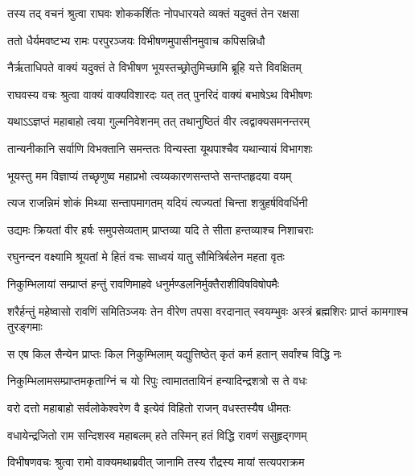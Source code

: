 
\twolineshloka
{तस्य तद् वचनं श्रुत्वा राघवः शोककर्शितः}
{नोपधारयते व्यक्तं यदुक्तं तेन रक्षसा} %

\twolineshloka
{ततो धैर्यमवष्टभ्य रामः परपुरञ्जयः}
{विभीषणमुपासीनमुवाच कपिसन्निधौ} %

\twolineshloka
{नैर्ऋताधिपते वाक्यं यदुक्तं ते विभीषण}
{भूयस्तच्छ्रोतुमिच्छामि ब्रूहि यत्ते विवक्षितम्} %

\twolineshloka
{राघवस्य वचः श्रुत्वा वाक्यं वाक्यविशारदः}
{यत् तत् पुनरिदं वाक्यं बभाषेऽथ विभीषणः} %

\twolineshloka
{यथाऽऽज्ञप्तं महाबाहो त्वया गुल्मनिवेशनम्}
{तत् तथानुष्ठितं वीर त्वद्वाक्यसमनन्तरम्} %

\twolineshloka
{तान्यनीकानि सर्वाणि विभक्तानि समन्ततः}
{विन्यस्ता यूथपाश्चैव यथान्यायं विभागशः} %

\twolineshloka
{भूयस्तु मम विज्ञाप्यं तच्छृणुष्व महाप्रभो}
{त्वय्यकारणसन्तप्ते सन्तप्तहृदया वयम्} %

\twolineshloka
{त्यज राजन्निमं शोकं मिथ्या सन्तापमागतम्}
{यदियं त्यज्यतां चिन्ता शत्रुहर्षविवर्धिनी} %

\twolineshloka
{उद्यमः क्रियतां वीर हर्षः समुपसेव्यताम्}
{प्राप्तव्या यदि ते सीता हन्तव्याश्च निशाचराः} %

\twolineshloka
{रघुनन्दन वक्ष्यामि श्रूयतां मे हितं वचः}
{साध्वयं यातु सौमित्रिर्बलेन महता वृतः} %

\twolineshloka
{निकुम्भिलायां सम्प्राप्तं हन्तुं रावणिमाहवे}
{धनुर्मण्डलनिर्मुक्तैराशीविषविषोपमैः} %

\threelineshloka
{शरैर्हन्तुं महेष्वासो रावणिं समितिञ्जयः}
{तेन वीरेण तपसा वरदानात् स्वयम्भुवः}
{अस्त्रं ब्रह्मशिरः प्राप्तं कामगाश्च तुरङ्गमाः} %

\twolineshloka
{स एष किल सैन्येन प्राप्तः किल निकुम्भिलाम्}
{यद्युत्तिष्ठेत् कृतं कर्म हतान् सर्वांश्च विद्धि नः} %

\twolineshloka
{निकुम्भिलामसम्प्राप्तमकृताग्निं च यो रिपुः}
{त्वामाततायिनं हन्यादिन्द्रशत्रो स ते वधः} %

\twolineshloka
{वरो दत्तो महाबाहो सर्वलोकेश्वरेण वै}
{इत्येवं विहितो राजन् वधस्तस्यैष धीमतः} %

\twolineshloka
{वधायेन्द्रजितो राम सन्दिशस्व महाबलम्}
{हते तस्मिन् हतं विद्धि रावणं ससुहृद्गणम्} %

\twolineshloka
{विभीषणवचः श्रुत्वा रामो वाक्यमथाब्रवीत्}
{जानामि तस्य रौद्रस्य मायां सत्यपराक्रम} %

